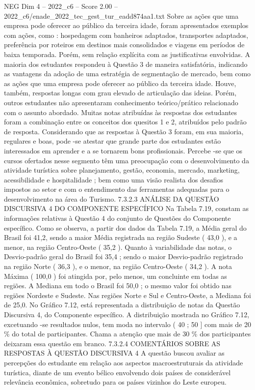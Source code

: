 \begin{textsample}{NEG Dim 4 – 2022\_c6 – Score 2.00 – 2022\_c6/enade\_2022\_tec\_gest\_tur\_eadd874aa1.txt}
Sobre as ações que uma empresa pode oferecer ao público da terceira idade, foram apresentados exemplos com ações, como : hospedagem com banheiros adaptados, transportes adaptados, preferência por roteiros em destinos mais consolidados e viagens em períodos de baixa temporada.
Porém, sem relação explícita com as justificativas envolvidas.
A maioria dos estudantes respondeu à Questão 3 de maneira satisfatória, indicando as vantagens da adoção de uma estratégia de segmentação de mercado, bem como as ações que uma empresa pode oferecer ao público da terceira idade.
Houve, também, respostas longas com grau elevado de articulação das ideias.
Porém, outros estudantes não apresentaram conhecimento teórico/prático relacionado com o assunto abordado.
Muitas notas atribuídas às respostas dos estudantes foram a combinação entre os conceitos dos quesitos 1 e 2, atribuídos pelo padrão de resposta.
Considerando que as respostas à Questão 3 foram, em sua maioria, regulares e boas, pode -se atestar que grande parte dos estudantes estão interessados em aprender e a se tornarem bons profissionais.
Percebe -se que os cursos ofertados nesse segmento têm uma preocupação com o desenvolvimento da atividade turística sobre planejamento, gestão, economia, mercado, marketing, acessibilidade e hospitalidade ; bem como uma visão realista dos desafios impostos ao setor e com o entendimento das ferramentas adequadas para o desenvolvimento na área do Turismo. 7.3.2.3 ANÁLISE DA QUESTÃO DISCURSIVA 4 DO COMPONENTE ESPECÍFICO Na Tabela 7.19, constam as informações relativas à Questão 4 do conjunto de Questões do Componente específico.
Como se observa, a partir dos dados da Tabela 7.19, a Média geral do Brasil foi 41,2, sendo a maior Média registrada na região Sudeste ( 43,0 ), e a menor, na região Centro-Oeste ( 35,2 ).
Quanto à variabilidade das notas, o Desvio-padrão geral do Brasil foi 35,4 ; sendo o maior Desvio-padrão registrado na região Norte ( 36,3 ), e o menor, na região Centro-Oeste ( 34,2 ).
A nota Máxima ( 100,0 ) foi atingida por, pelo menos, um concluinte em todas as regiões.
A Mediana em todo o Brasil foi 50,0 ; o mesmo valor foi obtido nas regiões Nordeste e Sudeste.
Nas regiões Norte e Sul e Centro-Oeste, a Mediana foi de 25,0.
No Gráfico 7.12, está representada a distribuição de notas da Questão Discursiva 4, do Componente específico.
A distribuição mostrada no Gráfico 7.12, excetuando -se resultados nulos, tem moda no intervalo ( 40 ; 50 ] com mais de 20 \% do total de participantes.
Chama a atenção que mais de 30 \% dos participantes deixaram essa questão em branco. 7.3.2.4 COMENTÁRIOS SOBRE AS RESPOSTAS À QUESTÃO DISCURSIVA 4 A questão buscou avaliar as percepções do estudante em relação aos aspectos macroestruturais da atividade turística, diante de um evento bélico envolvendo dois países de considerável relevância econômica, sobretudo para os países vizinhos do Leste europeu.

\end{textsample}
